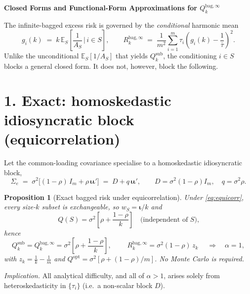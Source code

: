 \documentclass[11pt]{article}
\newcommand{\Sig}{\Sigma_e}
\newcommand{\E}{\mathbb{E}}
\newcommand{\Qsub}{Q_k^{\mathrm{sub}}}
\newcommand{\Qbag}{Q_k^{\mathrm{bag},\infty}}
\newcommand{\Qopt}{Q^{\mathrm{opt}}}
\newcommand{\Rk}{R_k^{\mathrm{bag},\infty}}
\newcommand{\iotab}{\bm{\iota}}
\newtheorem{proposition}{Proposition}
\begin{document}
\begin{center}
\textbf{\large Closed Forms and Functional-Form Approximations for $\Qbag$}
\end{center}

\noindent
The infinite-bagged excess risk is governed by the \emph{conditional} harmonic mean
\begin{equation}\label{eq:gdef}
  g_i(k)\;=\;k\,\E_S\!\left[\frac{1}{A_S}\,\Bigg|\,i\in S\right],
  \qquad
  \Rk \;=\; \frac{1}{m^2}\sum_{i=1}^m \tau_i\!\left(g_i(k)-\frac{1}{\bar\tau}\right)^{\!2}.
\end{equation}
Unlike the unconditional $\E_S[1/A_S]$ that yields $\Qsub$, the conditioning $i\in S$
blocks a general closed form. It does not, however, block the following.

\section*{1. Exact: homoskedastic idiosyncratic block (equicorrelation)}

Let the common-loading covariance specialise to a homoskedastic idiosyncratic block,
\begin{equation}\label{eq:equicorr}
  \Sig \;=\; \sigma^2\big[(1-\rho)\,I_m + \rho\,\iotab\iotab'\big]
  \;=\; D + q\,\iotab\iotab',
  \qquad D=\sigma^2(1-\rho)I_m,\quad q=\sigma^2\rho .
\end{equation}

\begin{proposition}[Exact bagged risk under equicorrelation]\label{prop:equi}
Under \eqref{eq:equicorr}, every size-$k$ subset is exchangeable, so $w_S=\iotab/k$ and
\begin{equation}
  Q(S)=\sigma^2\!\left[\rho+\frac{1-\rho}{k}\right]\quad\text{(independent of }S\text{),}
\end{equation}
hence
\begin{equation}\label{eq:equi-result}
  \Qsub=\Qbag=\sigma^2\!\left[\rho+\frac{1-\rho}{k}\right],
  \qquad
  \boxed{\;\Rk=\sigma^2(1-\rho)\,z_k\;}\quad\Longrightarrow\quad \alpha=1,
\end{equation}
with $z_k=\tfrac1k-\tfrac1m$ and $\Qopt=\sigma^2[\rho+(1-\rho)/m]$. No Monte Carlo is required.
\end{proposition}

\noindent\emph{Implication.} All analytical difficulty, and all of $\alpha>1$, arises
solely from heteroskedasticity in $\{\tau_i\}$ (i.e.\ a non-scalar block $D$).
\end{document}
